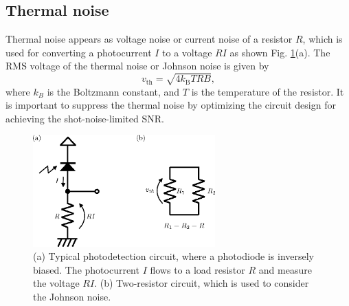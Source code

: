 \documentclass{book}
\begin{document}
\subsection{Thermal noise}
Thermal noise appears as voltage noise or current noise of a resistor $R$, which is used for converting a photocurrent $I$ to a voltage $RI$ as shown Fig. \ref{fig:photodetector}(a). The RMS voltage of the thermal noise or Johnson noise is given by
\begin{equation}
	v_\mathrm{th} = \sqrt{4k_\mathrm{B}TRB},
	\label{eq:Johnson_noise}
\end{equation}
where $k_B$ is the Boltzmann constant, and $T$ is the temperature of the resistor. It is important to suppress the thermal noise by optimizing the circuit design for achieving the shot-noise-limited SNR. 

\begin{figure}
  \centering
  \includegraphics[width=7cm]{fig/2-2_PD_circuit.eps} 
  \caption{(a) Typical photodetection circuit, where a photodiode is inversely biased. The photocurrent $I$ flows to a load resistor $R$ and measure the voltage $RI$. (b) Two-resistor  circuit, which is used to consider the Johnson noise.}
  \label{fig:photodetector}
\end{figure}
\end{document}
